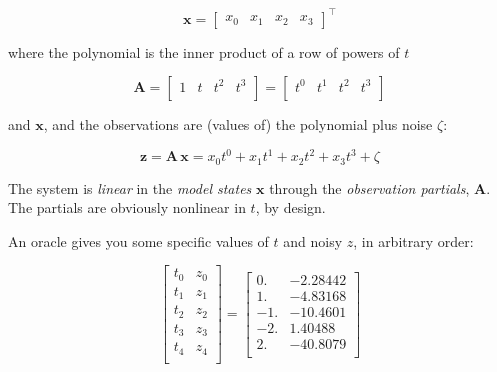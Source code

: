 \documentclass[10pt,oneside,x11names]{article}
\begin{document}
\begin{equation*}
\mathbold{x} =
\begin{bmatrix}
 x_0 &
 x_1 &
 x_2 &
 x_3 
\end{bmatrix} ^ \intercal
\end{equation*}

\noindent where the polynomial is the inner product of a row of powers of \(t\)

\begin{equation*}
\mathbold{A}=
\begin{bmatrix}
 1 & t & t^2 & t^3 \\
\end{bmatrix}
=
\begin{bmatrix}
 t^0 & t^1 & t^2 & t^3 \\
\end{bmatrix}
\end{equation*}

\noindent and \(\mathbold{x}\), and the observations are (values of) the
polynomial plus noise \(\zeta\):

\begin{equation*}
\mathbold{z}=\mathbold{A}\,\mathbold{x}=
x_0 t^0 + x_1 t^1 + x_2 t^2 + x_3 t^3 + \zeta
\end{equation*}

\noindent The system is \emph{linear} in the \emph{model states}
\(\mathbold{x}\) through the \emph{observation partials}, \(\mathbold{A}\). The
partials are obviously nonlinear in \(t\), by design.

An oracle gives you some specific values of \(t\) and noisy \(z\), in arbitrary order:

\begin{equation*}
\begin{bmatrix}
 t_0 & z_0 \\
 t_1 & z_1 \\
 t_2 & z_2 \\
 t_3 & z_3 \\
 t_4 & z_4 \\
\end{bmatrix}
=
\begin{bmatrix}
 0. & -2.28442 \\
 1. & -4.83168 \\
 -1. & -10.4601 \\
 -2. & 1.40488 \\
 2. & -40.8079 \\
\end{bmatrix}
\end{equation*}
\end{document}
